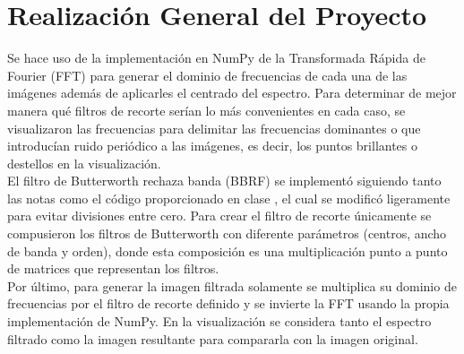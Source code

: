 \section{Realización General del Proyecto}
    Se hace uso de la implementación en NumPy \parencite{numpy_library} de la 
    Transformada Rápida de Fourier (FFT) para generar el dominio de frecuencias 
    de cada una de las imágenes además de aplicarles el centrado del espectro. 
    Para determinar de mejor manera qué filtros de recorte serían lo más 
    convenientes en cada caso, se visualizaron las frecuencias para delimitar 
    las frecuencias dominantes o que introducían ruido periódico a las imágenes, 
    es decir, los puntos brillantes o destellos en la visualización.\\

    El filtro de Butterworth rechaza banda (BBRF) se implementó siguiendo tanto 
    las notas como el código proporcionado en clase \parencite{tinoco2026pdi}, el 
    cual se modificó ligeramente para evitar divisiones entre cero. Para crear 
    el filtro de recorte únicamente se compusieron los filtros de Butterworth con 
    diferente parámetros (centros, ancho de banda y orden), donde esta composición 
    es una multiplicación punto a punto de matrices que representan los filtros. \\

    Por último, para generar la imagen filtrada solamente se multiplica su dominio 
    de frecuencias por el filtro de recorte definido y se invierte la FFT usando 
    la propia implementación de NumPy. En la visualización se considera tanto el 
    espectro filtrado como la imagen resultante para compararla con la imagen original.